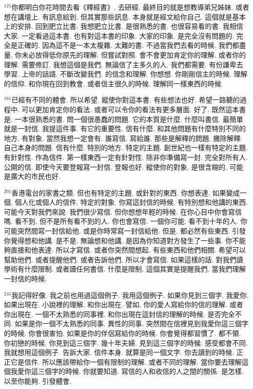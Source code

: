 \documentclass{book}
\begin{document}
$^{121}$你都明白你花時間去看《釋經書》.
去研經.
最終目的就是想教導弟兄姊妹.
或者想在講壇上.
有訊息給到.
但其實那些訊息.
本身就是經文給你自己.
這個就是基本上的安排.
回到肥立比書.
我想肥立比書.
是很熟悉的書.
也很容易看的書.
我相信大家.
一定看過這本書.
也有對這本書的印象.
大家的印象.
是完全沒有問題的.
完全是正確的.
因為這不是一本太複雜.
太難的書.
不過當我們去看的時候.
我們都盡量.
你未必放得低你原先的理解.
但嘗試對照.
會不會更加肯定你的理解.
或者你的理解.
需要修訂.
我想這個是我們.
無論信了主多久的人.
我們都需要.
有份謙卑去學習.
上帝的話語.
不斷改變我們.
的信念和理解.
你想想.
你剛剛信主的時候.
理解的信仰.
和你現在回到教會.
或者信主很久的時候.
理解同一樣東西的時候.

$^{161}$已經有不同的體會.
所以希望.
縱使你對這本書.
有些想法也好.
希望一路聽的過程中.
可以更加肯定你的看法.
或者可以令你的看法有更多層面.
好了.
既然這本書是.
一本很熟悉的書.
問一個很愚蠢的問題.
它的本質是什麼.
什麼叫書信.
最簡單就是一封信.
我提這件事.
有它的重要性.
信有什麼.
和其他問題有什麼特別不同的地方.
有對象.
當然我想一定會有.
誰寫信.
寫給誰.
那些是解釋的問題.
撇除解釋.
自己本身的問題.
信有什麼.
特別的地方.
特定的主題.
創世紀也一樣有特定的主題.
有針對性.
作為信件.
第一樣東西一定有針對性.
除非你準備寫一封.
完全對所有人.
公開的信.
即使今天要登報寫一封信.
登報也好.
縱使你的對象.
是很含糊的.
可能是廣大的市民也好.

$^{201}$香港電台的家書之類.
但也有特定的主題.
或針對的東西.
你想表達.
如果變成一個.
個人化或個人的信件.
特定的對象.
你寫這封信的時候.
有特別想和他講的東西.
可能今天對我們來說.
我們很少寫信.
但你想想年輕的時候.
在你心目中你會寫信嗎.
看不到.
但不是所有看不到的人.
你也會寫信.
一個你可能.
看不到十年的人.
你可能突然間寫一封信給他.
或是你時常寫一封信給他.
但是.
都必然有些東西.
引發你覺得想和他講.
是不是.
無論想和他講.
是因為你知道對方發生了一些事.
你不能夠直接和他表達.
所以才寫信.
或者你突然間想起.
有些東西和他們相關.
希望可以幫助他們.
或者提醒他們.
或者告訴他們.
所以才會寫信.
如果這樣的話.
對我們讀學術有什麼限制.
或者讀任何書信.
什麼是限制.
這個其實是提醒我們.
當我們理解一封信的時候.

$^{241}$我記得好像.
我之前也用過這個例子.
我用這個例子.
如果你見到三個字.
我愛你.
如果出現在.
小說裡的理解.
和你出現在.
譬如.
你的愛人寫給你的信的理解.
或者你出現在.
一個不太熟悉的同事裡.
和你出現在這封信的理解的時候.
是否完全不同.
如果是你一個不太熟悉的同事.
異性的同事.
突然間在信裡見到我愛你這三個字的時候.
你會很害怕.
如果是你的伴侶寫給你的時候.
你會覺得都習慣了.
都不領.
你初戀的時候.
你見到這三個字.
幾十年夫婦.
見到這三個字的時候.
感受都會不同.
我就想用這個例子.
告訴大家.
信件本身.
就算是同一個文字.
你去讀到的時候.
正正它是信件.
所以應該帶給你一個有限制的理解.
或者不同的理解.
當你要去理解這個我愛你這三個字的時候.
你就要知道.
寫信的人和收信的人之間的關係.
是怎樣.
以至你能夠.
引發體會.
\end{document}
